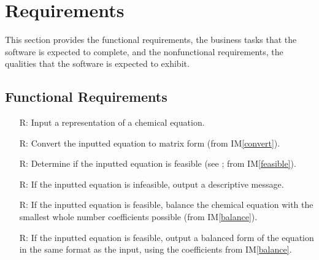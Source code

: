 \documentclass[12pt]{article}
\newcommand{\iref}[1]{IM\ref{#1}}
\newcounter{reqnum} %
\begin{document}

\newpage

\section{Requirements}
This section provides the functional requirements, the business tasks that the
software is expected to complete, and the nonfunctional requirements, the
qualities that the software is expected to exhibit.

\subsection{Functional Requirements} \label{sec_funcReqs}

\begin{itemize}

  \item[R\refstepcounter{reqnum}\thereqnum \label{R_input}:] Input a
    representation of a chemical equation.

  \item[R\refstepcounter{reqnum}\thereqnum \label{R_convert}:] Convert the
    inputted equation to matrix form (from \iref{convert}).

  \item[R\refstepcounter{reqnum}\thereqnum \label{R_feasible}:] Determine if the
    inputted equation is feasible (see ;	from
    \iref{feasible}).

  \item[R\refstepcounter{reqnum}\thereqnum \label{R_infeasOutput}:] If the
    inputted equation is infeasible, output a descriptive message.

  \item[R\refstepcounter{reqnum}\thereqnum \label{R_balance}:] If the
    inputted equation is feasible, balance the chemical equation with the smallest
    whole number coefficients possible (from \iref{balance}).

  \item[R\refstepcounter{reqnum}\thereqnum \label{R_feasOutput}:] If the
    inputted equation is feasible, output a balanced form of the equation in the
    same format as the input, using the coefficients from \iref{balance}.

\end{itemize}
\end{document}
